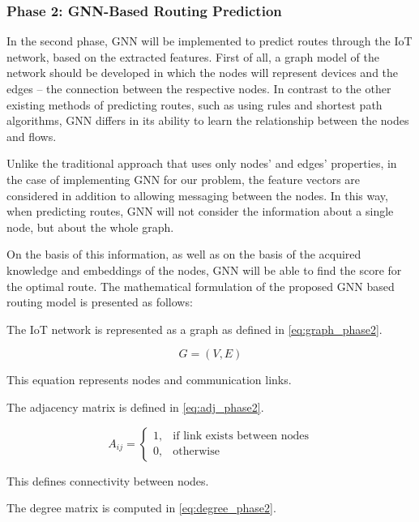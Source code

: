 \documentclass[a4paper,fleqn]{cas-dc}
\numberwithin{equation}{section}
\begin{document}
\subsubsection{Phase 2: GNN-Based Routing Prediction}
In the second phase, GNN will be implemented to predict routes through the IoT network, based on the extracted features. First of all, a graph model of the network should be developed in which the nodes will represent devices and the edges – the connection between the respective nodes. In contrast to the other existing methods of predicting routes, such as using rules and shortest path algorithms, GNN differs in its ability to learn the relationship between the nodes and flows.

Unlike the traditional approach that uses only nodes' and edges' properties, in the case of implementing GNN for our problem, the feature vectors are considered in addition to allowing messaging between the nodes. In this way, when predicting routes, GNN will not consider the information about a single node, but about the whole graph.

On the basis of this information, as well as on the basis of the acquired knowledge and embeddings of the nodes, GNN will be able to find the score for the optimal route.
\vspace{6pt}
The mathematical formulation of the proposed GNN based routing model is presented as follows: 
\vspace{6pt}


The IoT network is represented as a graph as defined in \ref{eq:graph_phase2}.

\begin{equation}
G = (V, E)
\label{eq:graph_phase2}
\end{equation}

This equation represents nodes and communication links.

The adjacency matrix is defined in \ref{eq:adj_phase2}.

\begin{equation}
A_{ij} =
\begin{cases}
1, & \text{if link exists between nodes} \\
0, & \text{otherwise}
\end{cases}
\label{eq:adj_phase2}
\end{equation}

This defines connectivity between nodes.

The degree matrix is computed in \ref{eq:degree_phase2}.
\end{document}
